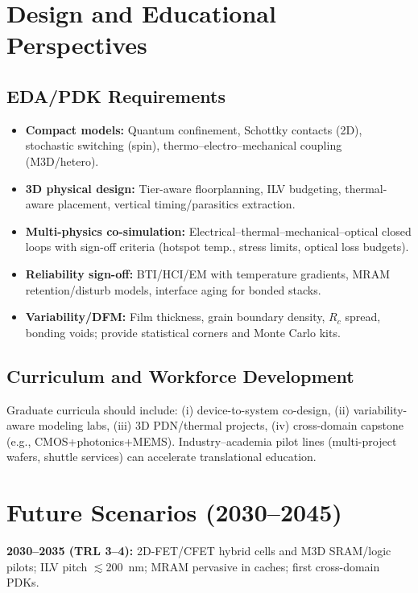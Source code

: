 \documentclass[conference]{IEEEtran}
\begin{document}
\section{Design and Educational Perspectives}

\subsection{EDA/PDK Requirements}
\begin{itemize}
  \item \textbf{Compact models:} Quantum confinement, Schottky contacts (2D), stochastic switching (spin), thermo--electro--mechanical coupling (M3D/hetero).
  \item \textbf{3D physical design:} Tier-aware floorplanning, ILV budgeting, thermal-aware placement, vertical timing/parasitics extraction.
  \item \textbf{Multi-physics co-simulation:} Electrical--thermal--mechanical--optical closed loops with sign-off criteria (hotspot temp., stress limits, optical loss budgets).
  \item \textbf{Reliability sign-off:} BTI/HCI/EM with temperature gradients, MRAM retention/disturb models, interface aging for bonded stacks.
  \item \textbf{Variability/DFM:} Film thickness, grain boundary density, $R_c$ spread, bonding voids; provide statistical corners and Monte Carlo kits.
\end{itemize}

\subsection{Curriculum and Workforce Development}
Graduate curricula should include: (i) device-to-system co-design, (ii) variability-aware modeling labs, (iii) 3D PDN/thermal projects, (iv) cross-domain capstone (e.g., CMOS+photonics+MEMS).
Industry--academia pilot lines (multi-project wafers, shuttle services) can accelerate translational education.

\section{Future Scenarios (2030--2045)}

\noindent\textbf{2030--2035 (TRL 3--4):}
2D-FET/CFET hybrid cells and M3D SRAM/logic pilots; ILV pitch \(\lesssim\)\SI{200}{nm}; MRAM pervasive in caches; first cross-domain PDKs.
\end{document}
